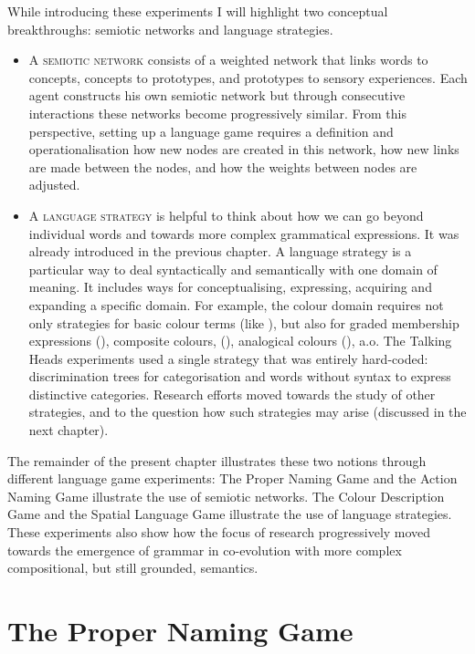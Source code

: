 While introducing these experiments I will highlight two conceptual breakthroughs: semiotic networks and language strategies. 
\begin{itemize}
\item A {\scshape semiotic network} consists of a weighted network that links words to concepts, concepts to prototypes, and prototypes to 
sensory experiences. Each agent constructs his own semiotic network but through consecutive 
interactions these networks become progressively similar. From this perspective, setting up a language game requires a definition and 
operationalisation how new nodes are created in this network, how new links are made between 
the nodes, and how the weights between nodes are adjusted. 
\item A {\scshape language strategy} is helpful to think about how we can go beyond individual words and towards 
more complex grammatical expressions. It was already introduced in the previous chapter. 
A language strategy is a particular way to deal syntactically and semantically 
with one domain of meaning. It includes ways for conceptualising, expressing, acquiring and expanding a specific domain. 
For example, the colour domain requires not only strategies for basic colour terms (like ), but also for 
graded membership expressions (), composite colours, (), analogical colours (), a.o. 
The Talking Heads experiments used a single strategy that was entirely hard-coded: discrimination trees for categorisation 
and words without syntax to express distinctive categories. Research efforts moved towards the study of other strategies, and 
to the question how such strategies may arise (discussed in the next chapter). 
\end{itemize}
The remainder of the present chapter illustrates these two notions through different language game experiments: The Proper 
Naming Game and the Action Naming Game illustrate the use of semiotic networks. The Colour Description Game and the 
Spatial Language Game illustrate the use of language strategies. These experiments also show how the focus of research 
progressively moved towards the emergence of grammar in co-evolution with more complex compositional, but still 
grounded, semantics. 

\section{The Proper Naming Game}


